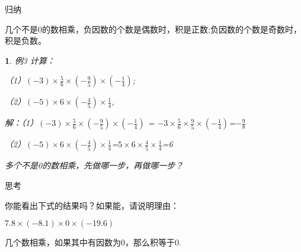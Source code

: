 \documentclass{article}
\newtheorem{example}{ }
\begin{document}
\begin{article}
归纳

几个不是0的数相乘，负因数的个数是偶数时，积是正数;负因数的个数是奇数时，积是负数。

\begin{example}

例3 计算：

（1）$(-3)\times\frac{5}{6}\times(-\frac{9}{5})\times(-\frac{1}{4})$;

（2）$(-5)\times6\times(-\frac{4}{5})\times\frac{1}{4}$,

解：（1）$(-3)\times\frac{5}{6}\times(-\frac{9}{5})\times(-\frac{1}{4})$ = 
$-3\times\frac{5}{6}\times\frac{9}{5}\times(-\frac{1}{4})$=$-\frac{9}{8}$

（2）$(-5)\times6\times(-\frac{4}{5})\times\frac{1}{4}$=$5\times6\times\frac{4}{5}\times\frac{1}{4}$=6

多个不是0的数相乘，先做哪一步，再做哪一步？

\end{example}

思考

你能看出下式的结果吗？如果能，请说明理由：

$7.8\times(-8.1)\times0\times(-19.6)$

几个数相乘，如果其中有因数为0，那么积等于0.

\end{article}
\end{document}
